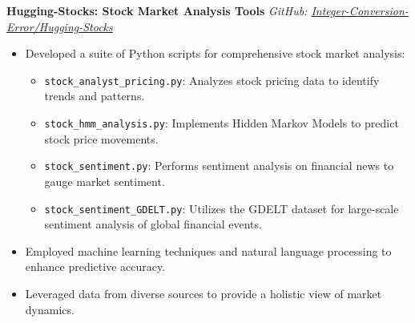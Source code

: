 \documentclass[11pt]{article}
\begin{document}
\textbf{Hugging-Stocks: Stock Market Analysis Tools} \hfill \textit{GitHub: \href{https://github.com/Integer-Conversion-Error/Hugging-Stocks}{Integer-Conversion-Error/Hugging-Stocks}}
\begin{itemize}
    \item Developed a suite of Python scripts for comprehensive stock market analysis:
    \begin{itemize}
        \item \texttt{stock\_analyst\_pricing.py}: Analyzes stock pricing data to identify trends and patterns.
        \item \texttt{stock\_hmm\_analysis.py}: Implements Hidden Markov Models to predict stock price movements.
        \item \texttt{stock\_sentiment.py}: Performs sentiment analysis on financial news to gauge market sentiment.
        \item \texttt{stock\_sentiment\_GDELT.py}: Utilizes the GDELT dataset for large-scale sentiment analysis of global financial events.
    \end{itemize}
    \item Employed machine learning techniques and natural language processing to enhance predictive accuracy.
    \item Leveraged data from diverse sources to provide a holistic view of market dynamics.
\end{itemize}
\end{document}
